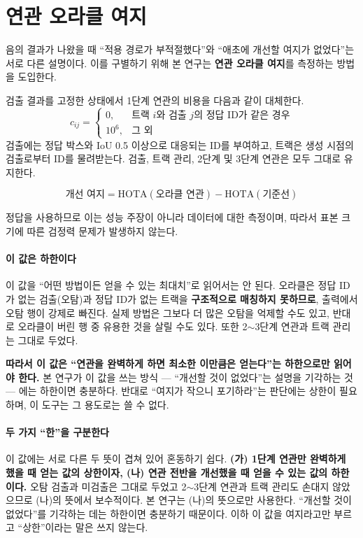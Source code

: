 \documentclass[12pt,a4paper,oneside]{report}
\begin{document}
\section{연관 오라클 여지}\label{sec:4-3}

음의 결과가 나왔을 때 ``적용 경로가 부적절했다''와 ``애초에 개선할 여지가 없었다''는 서로 다른 설명이다. 이를 구별하기 위해 본 연구는 \textbf{연관 오라클 여지}를 측정하는 방법을 도입한다.

검출 결과를 고정한 상태에서 1단계 연관의 비용을 다음과 같이 대체한다.
\begin{equation}
c_{ij} =
\begin{cases}
0, & \text{트랙 } i \text{와 검출 } j \text{의 정답 ID가 같은 경우}\\
10^6, & \text{그 외}
\end{cases}
\end{equation}
검출에는 정답 박스와 IoU 0.5 이상으로 대응되는 ID를 부여하고, 트랙은 생성 시점의 검출로부터 ID를 물려받는다. 검출, 트랙 관리, 2단계 및 3단계 연관은 모두 그대로 유지한다.

\begin{equation}
\text{개선 여지} = \text{HOTA}(\text{오라클 연관}) - \text{HOTA}(\text{기준선})
\end{equation}

정답을 사용하므로 이는 성능 주장이 아니라 데이터에 대한 측정이며, 따라서 표본 크기에 따른 검정력 문제가 발생하지 않는다.

\paragraph{이 값은 하한이다} 이 값을 ``어떤 방법이든 얻을 수 있는 최대치''로 읽어서는 안 된다. 오라클은 정답 ID가 없는 검출(오탐)과 정답 ID가 없는 트랙을 \textbf{구조적으로 매칭하지 못하므로}, 출력에서 오탐 행이 강제로 빠진다. 실제 방법은 그보다 더 많은 오탐을 억제할 수도 있고, 반대로 오라클이 버린 행 중 유용한 것을 살릴 수도 있다. 또한 2$\sim$3단계 연관과 트랙 관리는 그대로 두었다.

\textbf{따라서 이 값은 ``연관을 완벽하게 하면 최소한 이만큼은 얻는다''는 하한으로만 읽어야 한다.} 본 연구가 이 값을 쓰는 방식 --- ``개선할 것이 없었다''는 설명을 기각하는 것 --- 에는 하한이면 충분하다. 반대로 ``여지가 작으니 포기하라''는 판단에는 상한이 필요하며, 이 도구는 그 용도로는 쓸 수 없다.

\paragraph{두 가지 ``한''을 구분한다} 이 값에는 서로 다른 두 뜻이 겹쳐 있어 혼동하기 쉽다. \textbf{(가) 1단계 연관만 완벽하게 했을 때 얻는 값의 상한이자, (나) 연관 전반을 개선했을 때 얻을 수 있는 값의 하한이다.} 오탐 검출과 미검출은 그대로 두었고 2$\sim$3단계 연관과 트랙 관리도 손대지 않았으므로 (나)의 뜻에서 보수적이다. 본 연구는 (나)의 뜻으로만 사용한다. ``개선할 것이 없었다''를 기각하는 데는 하한이면 충분하기 때문이다. 이하 이 값을 여지라고만 부르고 ``상한''이라는 말은 쓰지 않는다.
\end{document}
